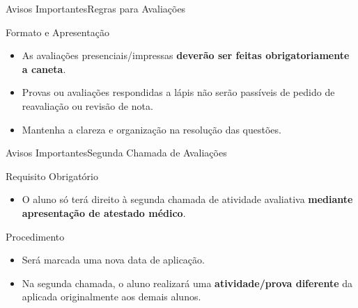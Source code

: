 \documentclass[9pt]{beamer}
\begin{document}
\begin{frame}{Avisos Importantes}{Regras para Avaliações}
  \begin{block}{Formato e Apresentação}
    \begin{itemize}
      \item As avaliações presenciais/impressas \textbf{deverão ser feitas obrigatoriamente a caneta}.
      \item Provas ou avaliações respondidas a lápis não serão passíveis de pedido de reavaliação ou revisão de nota.
      \item Mantenha a clareza e organização na resolução das questões.
    \end{itemize}
  \end{block}
\end{frame}

\begin{frame}{Avisos Importantes}{Segunda Chamada de Avaliações}
  \begin{alertblock}{Requisito Obrigatório}
    \begin{itemize}
      \item O aluno só terá direito à segunda chamada de atividade avaliativa \textbf{mediante apresentação de atestado médico}.
    \end{itemize}
  \end{alertblock}

  \begin{block}{Procedimento}
    \begin{itemize}
      \item Será marcada uma nova data de aplicação.
      \item Na segunda chamada, o aluno realizará uma \textbf{atividade/prova diferente} da aplicada originalmente aos demais alunos.
    \end{itemize}
  \end{block}
\end{frame}
\end{document}
